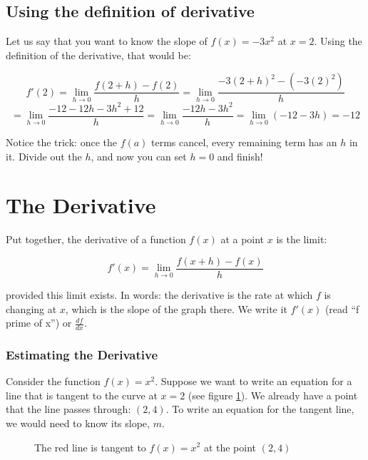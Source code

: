 \subsection{Using the definition of derivative}

Let us say that you want to know the slope of $f(x) = -3x^2$ at $x = 2$.
Using the definition of the derivative, that would be:

$$f'(2) = \lim_{h \to 0}\frac{f(2 + h) - f(2)}{h} 
= \lim_{h \to 0}\frac{-3(2 + h)^2- \left(-3(2)^2\right)}
{h} $$
$$= \lim_{h \to 0}\frac{-12 - 12h - 3h^2 + 12}{h}
= \lim_{h \to 0}\frac{-12h - 3h^2}{h}
= \lim_{h \to 0}\left(-12 - 3h\right) = -12$$

Notice the trick: once the $f(a)$ terms cancel, every remaining term has
an $h$ in it. Divide out the $h$, and now you can set $h = 0$ and finish!


\section{The Derivative}

Put together, the derivative of a function $f(x)$ at a point $x$ is the limit:

\begin{equation}
f'(x) = \lim_{{h \to 0}} \frac{f(x+h) - f(x)}{h}
\end{equation}

provided this limit exists. In words: the derivative is the rate at which
$f$ is changing at $x$, which is the slope of the graph there. We write it
$f'(x)$ (read ``f prime of x'') or $\frac{df}{dx}$.

\subsubsection{Estimating the Derivative}
Consider the function $f(x) = x^2$. Suppose we want to write an equation for a 
line that is tangent to the curve at $x = 2$ (see figure \ref{fig:tangent}). 
We already have a point that the line passes through: $(2, 4)$. To write an 
equation for the tangent line, we would need to know its slope, $m$. 

\begin{figure}[H]
    \centering
    \caption{The red line is tangent to $f(x) = x^2$ at the point $(2, 4)$}
    \label{fig:tangent}
\end{figure}

